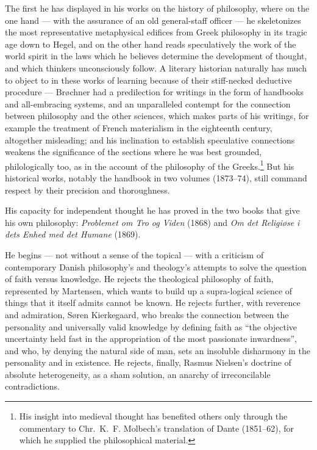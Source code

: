 \documentclass[12pt,a4paper,openany]{book}
\newcommand{\opage}[1]{\marginnote{\footnotesize\textit{[#1]}}}
\begin{document}
The first he has displayed in his works on the history of philosophy, where on the one hand --- with the assurance
of an old general-staff officer --- he skeletonizes the most representative metaphysical edifices from Greek
philosophy in its tragic age down to Hegel, and on the other hand reads speculatively the work of the world spirit
in the laws which he believes determine the development of thought, and which thinkers unconsciously follow. A
literary historian naturally has much to object to in these works of learning because of their stiff-necked
deductive procedure --- Brøchner had a predilection for writings in the form of handbooks and all-embracing systems,
and an unparalleled contempt for the connection between philosophy and the other sciences, which makes parts of his
writings, for example the treatment of French materialism in the eighteenth century, altogether misleading; and his
inclination to establish speculative connections weakens the significance of the sections where he was best
grounded, philologically too, as in the account of the philosophy of the
Greeks.\footnote{His insight into medieval thought has benefited others only through the commentary to
Chr.~K.~F. Molbech's translation of Dante (1851--62), for which he supplied the philosophical material.}
But his historical works, notably the handbook in two volumes (1873--74), still command respect by their precision
and thoroughness.

His capacity for independent thought he has proved in the two books that give his own philosophy:
\textit{Problemet om Tro og Viden} (1868) and \textit{Om det Religiøse i dets Enhed med det Humane} (1869).

He begins --- not without a sense of the topical --- with a criticism of contemporary Danish philosophy's and
theology's attempts to solve the question of faith versus knowledge. He rejects the theological philosophy of
faith, represented by Martensen, which wants to build up a supra-logical science of things that it itself admits
cannot be known. He rejects further, with reverence and admiration, Søren Kierkegaard, who breaks the connection
between the personality and
\opage{154}\setcounter{footnote}{0}%
universally valid knowledge by defining faith as ``the objective uncertainty held fast in the appropriation of the
most passionate inwardness'', and who, by denying the natural side of man, sets an insoluble disharmony in the
personality and in existence. He rejects, finally, Rasmus Nielsen's doctrine of absolute heterogeneity, as a sham
solution, an anarchy of irreconcilable contradictions.
\end{document}
